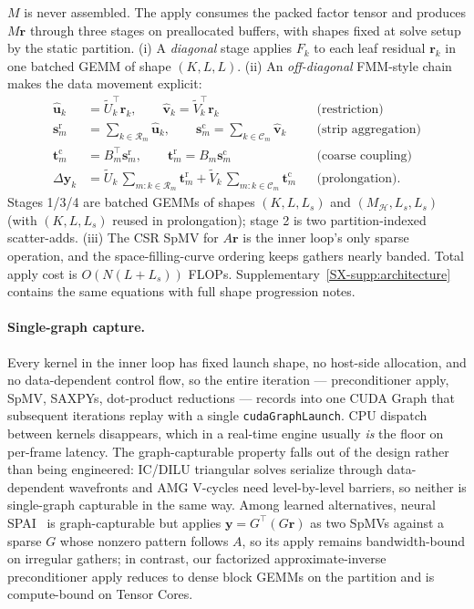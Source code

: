 \documentclass[acmtog,anonymous,review]{acmart}
\theoremstyle{plain}
\begin{document}
$M$ is never assembled. The apply consumes the packed factor tensor and produces $M\mathbf{r}$
through three stages on preallocated buffers, with shapes fixed at solve setup by the static
partition. (i) A \emph{diagonal} stage applies $F_k$ to each leaf residual $\mathbf{r}_k$ in
one batched GEMM of shape $(K,L,L)$. (ii) An \emph{off-diagonal} FMM-style chain makes the
data movement explicit:
\begin{align}
  \hat{\mathbf{u}}_k &= \tilde U_k^\top\mathbf{r}_k,\qquad
  \hat{\mathbf{v}}_k = \tilde V_k^\top\mathbf{r}_k && \text{(restriction)} \\
  \mathbf{s}^{\mathrm{r}}_m &= \sum_{k\in\mathcal{R}_m}\hat{\mathbf{u}}_k,\qquad
  \mathbf{s}^{\mathrm{c}}_m = \sum_{k\in\mathcal{C}_m}\hat{\mathbf{v}}_k
  && \text{(strip aggregation)} \\
  \mathbf{t}^{\mathrm{c}}_m &= B_m^\top\mathbf{s}^{\mathrm{r}}_m,\qquad
  \mathbf{t}^{\mathrm{r}}_m = B_m\mathbf{s}^{\mathrm{c}}_m && \text{(coarse coupling)} \\
  \Delta\mathbf{y}_k &= \tilde U_k\,{\textstyle\sum_{m:k\in\mathcal{R}_m}\!\mathbf{t}^{\mathrm{r}}_m}
                    +  \tilde V_k\,{\textstyle\sum_{m:k\in\mathcal{C}_m}\!\mathbf{t}^{\mathrm{c}}_m}
  && \text{(prolongation).}
\end{align}
Stages 1/3/4 are batched GEMMs of shapes $(K,L,L_s)$ and
$(M_{\mathcal{H}},L_s,L_s)$ (with $(K,L,L_s)$ reused in prolongation);
stage 2 is two partition-indexed scatter-adds. (iii) The CSR SpMV for $A\mathbf{r}$ is the
inner loop's only sparse operation, and the space-filling-curve ordering keeps gathers nearly
banded. Total apply cost is $O(N(L+L_s))$ FLOPs. Supplementary~\ref{SX-supp:architecture}
contains the same equations with full shape progression notes.

\paragraph{Single-graph capture.}
Every kernel in the inner loop has fixed launch shape, no host-side allocation, and no
data-dependent control flow, so the entire iteration --- preconditioner apply, SpMV,
SAXPYs, dot-product reductions --- records into one CUDA Graph that subsequent iterations
replay with a single \verb|cudaGraphLaunch|. CPU dispatch between kernels disappears,
which in a real-time engine usually \emph{is} the floor on per-frame latency. The
graph-capturable property falls out of the design rather than being engineered:
IC/DILU triangular solves serialize through data-dependent wavefronts and AMG V-cycles
need level-by-level barriers, so neither is single-graph capturable in the same way.
Among learned alternatives, neural SPAI~\cite{Yang2025sparse} is graph-capturable but
applies $\mathbf{y}\!=\!G^\top(G\mathbf{r})$ as two SpMVs against a sparse $G$ whose
nonzero pattern follows $A$, so its apply remains bandwidth-bound on irregular gathers;
in contrast, our factorized approximate-inverse preconditioner apply reduces to dense
block GEMMs on the partition and is compute-bound on Tensor Cores.
\end{document}
